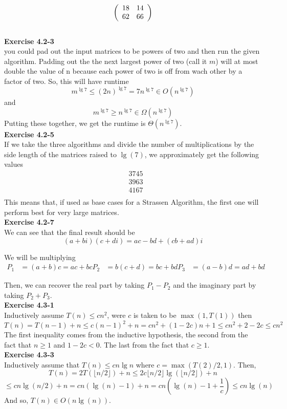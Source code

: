 \documentclass{article}
\begin{document}
\[
\left(\begin{array}{c c}18&14\\62&66\end{array}\right)
\]\\

\noindent\textbf{Exercise 4.2-3}\\
you could pad out the input matrices to be powers of two and then run the given algorithm. Padding out the the next largest power of two (call it $m$) will at most double the value of n because each power of two is off from wach other by a factor of two. So, this will have runtime
\[
m^{\lg 7} \le (2n)^{\lg 7} = 7 n^{\lg 7} \in O(n^{\lg 7})
\]
and
\[
m^{\lg 7} \ge n^{\lg 7} \in \Omega(n^{\lg 7})
\]
Putting these together, we get the runtime is $\Theta(n^{\lg 7})$.\\

\noindent\textbf{Exercise 4.2-5}\\
If we take the three algorithms and divide the number of multiplications by the side length of the matrices raised to $\lg(7)$, we approximately get the following values
\begin{align*}
&3745\\
&3963\\
&4167\\
\end{align*}
This means that, if used as base cases for a Strassen Algorithm, the first one will perform best for very large matrices.\\


\noindent\textbf{Exercise 4.2-7}\\
We can see that the final result should be
\[
(a+bi)(c+di) = ac-bd +(cb+ad) i
\]

We will be multiplying 
\begin{align*}
P_1 &= (a+b)c = ac+bc
P_2 &= b(c+d) = bc+bd
P_3&= (a-b)d = ad+bd
\end{align*}

Then, we can recover the real part by taking $P_1 - P_2$ and the imaginary part by taking $P_2+P_3$.\\

\noindent\textbf{Exercise 4.3-1}\\
Inductively assume $T(n)\le c n^2$, were $c$ is taken to be $\max(1,T(1))$ then
\[
T(n) = T(n-1)+n \le c(n-1)^2 +n = c n^2 +(1-2c)n + 1 \le c n^2 +2-2c \le c n^2
\]
The first inequality comes from the inductive hypothesis, the second from the fact that $n\ge 1$ and $1-2c <0$. The last from the fact that $c\ge 1$.\\
\noindent\textbf{Exercise 4.3-3}\\
Inductively assume that $T(n) \le cn\lg n$ where $c = \max(T(2)/2,1)$. Then, 
\[
T(n) = 2 T(\lfloor n/2\rfloor) + n \le 2 c\lfloor n/2 \rfloor \lg(\lfloor n/2\rfloor) +n
\]
\[
\le cn \lg(n/2) +n = cn (\lg(n) - 1) +n = cn(\lg(n) -1+\frac{1}{c}) \le cn\lg(n)
\]
And so, $T(n)\in O(n\lg(n))$.
\end{document}
